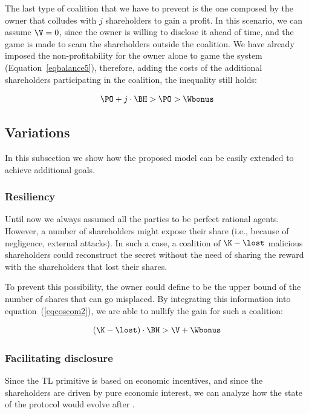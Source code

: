 The last type of coalition that we have to prevent is the one composed by the owner that colludes with $j$ shareholders to gain a profit. In this scenario, we can assume $\V = 0$, since the owner is willing to disclose it ahead of time, and the game is made to scam the shareholders outside the coalition.
%
We have already imposed the non-profitability for the owner alone to game the system (Equation~\ref{eqbalance5}), therefore, adding the costs of the additional shareholders participating in the coalition, the inequality still holds:

\begin{equation}
\PO + j \cdot  \BH > \PO > \Wbonus
\end{equation}

\subsection{Variations}

In this subsection we show how the proposed model can be easily extended to achieve additional goals.

\subsubsection{Resiliency}

Until now we always assumed all the parties to be perfect rational agents. However, a number of shareholders \lost might expose their share (i.e., because of negligence, external attacks). In such a case, a coalition of $\K - \lost$ malicious shareholders could reconstruct the secret without the need of sharing the reward with the shareholders that lost their shares.

To prevent this possibility, the owner could define \lost to be the upper bound of the number of shares that can go misplaced. By integrating this information into equation~(\ref{eqcoscom2}), we are able to nullify the gain for such a coalition:

\begin{equation}\label{eqcoscom3}
(\K - \lost) \cdot \BH  > \V + \Wbonus
\end{equation}

\subsubsection{Facilitating disclosure}\label{subsect:fac_discl}

Since the TL primitive is based on economic incentives, and since the shareholders are driven by pure economic interest, we can analyze how the state of the protocol would evolve after \td.

